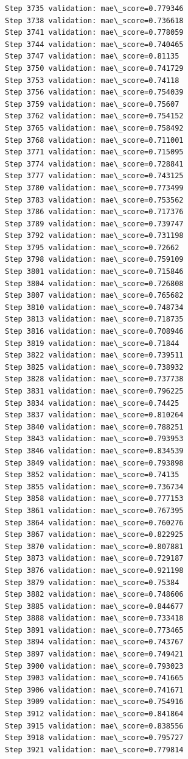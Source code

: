 \documentclass[11pt]{article}
\begin{document}
\begin{Verbatim}[commandchars=\\\{\}]
Step 3735 validation: mae\_score=0.779346
Step 3738 validation: mae\_score=0.736618
Step 3741 validation: mae\_score=0.778059
Step 3744 validation: mae\_score=0.740465
Step 3747 validation: mae\_score=0.81135
Step 3750 validation: mae\_score=0.741729
Step 3753 validation: mae\_score=0.74118
Step 3756 validation: mae\_score=0.754039
Step 3759 validation: mae\_score=0.75607
Step 3762 validation: mae\_score=0.754152
Step 3765 validation: mae\_score=0.758492
Step 3768 validation: mae\_score=0.711001
Step 3771 validation: mae\_score=0.715095
Step 3774 validation: mae\_score=0.728841
Step 3777 validation: mae\_score=0.743125
Step 3780 validation: mae\_score=0.773499
Step 3783 validation: mae\_score=0.753562
Step 3786 validation: mae\_score=0.717376
Step 3789 validation: mae\_score=0.739747
Step 3792 validation: mae\_score=0.731198
Step 3795 validation: mae\_score=0.72662
Step 3798 validation: mae\_score=0.759109
Step 3801 validation: mae\_score=0.715846
Step 3804 validation: mae\_score=0.726808
Step 3807 validation: mae\_score=0.765682
Step 3810 validation: mae\_score=0.748734
Step 3813 validation: mae\_score=0.718735
Step 3816 validation: mae\_score=0.708946
Step 3819 validation: mae\_score=0.71844
Step 3822 validation: mae\_score=0.739511
Step 3825 validation: mae\_score=0.738932
Step 3828 validation: mae\_score=0.737738
Step 3831 validation: mae\_score=0.796225
Step 3834 validation: mae\_score=0.74425
Step 3837 validation: mae\_score=0.810264
Step 3840 validation: mae\_score=0.788251
Step 3843 validation: mae\_score=0.793953
Step 3846 validation: mae\_score=0.834539
Step 3849 validation: mae\_score=0.793898
Step 3852 validation: mae\_score=0.74135
Step 3855 validation: mae\_score=0.736734
Step 3858 validation: mae\_score=0.777153
Step 3861 validation: mae\_score=0.767395
Step 3864 validation: mae\_score=0.760276
Step 3867 validation: mae\_score=0.822925
Step 3870 validation: mae\_score=0.807881
Step 3873 validation: mae\_score=0.729187
Step 3876 validation: mae\_score=0.921198
Step 3879 validation: mae\_score=0.75384
Step 3882 validation: mae\_score=0.748606
Step 3885 validation: mae\_score=0.844677
Step 3888 validation: mae\_score=0.733418
Step 3891 validation: mae\_score=0.773465
Step 3894 validation: mae\_score=0.743767
Step 3897 validation: mae\_score=0.749421
Step 3900 validation: mae\_score=0.793023
Step 3903 validation: mae\_score=0.741665
Step 3906 validation: mae\_score=0.741671
Step 3909 validation: mae\_score=0.754916
Step 3912 validation: mae\_score=0.841864
Step 3915 validation: mae\_score=0.838556
Step 3918 validation: mae\_score=0.795727
Step 3921 validation: mae\_score=0.779814

\end{Verbatim}
\end{document}
